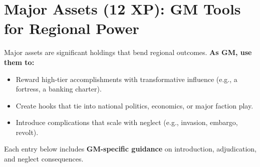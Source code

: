 \section{Major Assets (12 XP): GM Tools for Regional Power}
\label{sec:major-assets}
Major assets are significant holdings that bend regional outcomes. \textbf{As GM, use them to:}  
\begin{itemize}
  \item Reward high-tier accomplishments with transformative influence (e.g., a fortress, a banking charter).  
  \item Create hooks that tie into national politics, economics, or major faction play.  
  \item Introduce complications that scale with neglect (e.g., invasion, embargo, revolt).  
\end{itemize}
Each entry below includes \textbf{GM-specific guidance} on introduction, adjudication, and neglect consequences.

